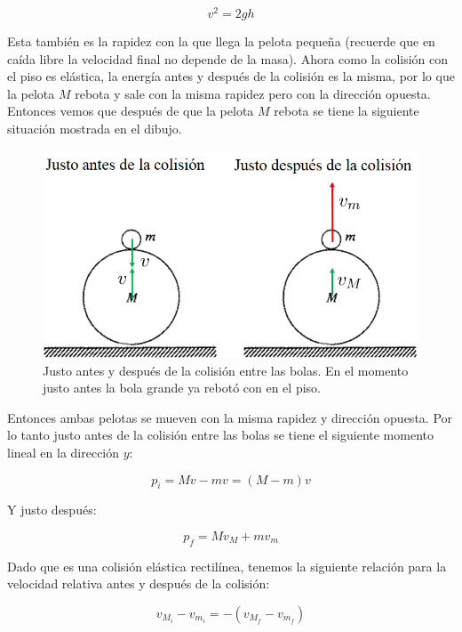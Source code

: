 \documentclass[a4paper,11pt]{article}
\begin{document}
$$v^2 = 2gh$$


Esta también es la rapidez con la que llega la pelota pequeña (recuerde que en caída libre la velocidad final no depende de la masa). Ahora como la colisión con el piso es elástica, la energía antes y después de la colisión es la misma, por lo que la pelota $M$ rebota y sale con la misma rapidez pero con la dirección opuesta. Entonces vemos que después de que la pelota $M$ rebota se tiene la siguiente situación mostrada en el dibujo.

\vspace{1cm}

\begin{figure}[H]
	\centering
	\includegraphics[scale=1]{./im/2}
	\caption{Justo antes y después de la colisión entre las bolas. En el momento justo antes la bola grande ya rebotó con en el piso.}
\end{figure}

\vspace{0.5cm}

Entonces ambas pelotas se mueven con la misma rapidez y dirección opuesta. Por lo tanto justo antes de la colisión entre las bolas se tiene el siguiente momento lineal en la dirección $y$:

$$ p_{i} = M v - m v = (M-m)v$$

Y justo después:

\begin{equation}
p_f = M v_M + m v_m
\end{equation}



Dado que es una colisión elástica rectilínea, tenemos la siguiente relación para la velocidad relativa antes y después de la colisión:

\begin{equation}
v_{M_i} -v_{m_i} = -(v_{M_f} -v_{m_f})
\end{equation}
\end{document}
